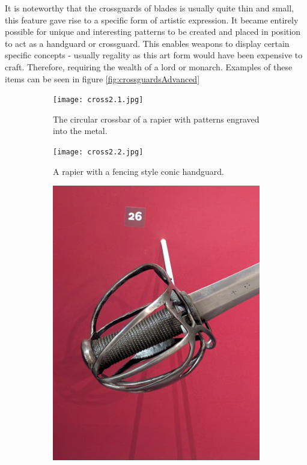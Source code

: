\documentclass{article}
\begin{document}
It is noteworthy that the crossguards of blades is usually quite thin and small, this feature gave rise to a specific form of artistic expression. It became entirely possible for unique and interesting patterns to be created and placed in position to act as a handguard or crossguard. This enables weapons to display certain specific concepts - usually regality as this art form would have been expensive to craft. Therefore, requiring the wealth of a lord or monarch. Examples of these items can be seen in figure \ref{fig:crossguardsAdvanced}

\begin{figure}[H]
    \centering
    \caption{A collection of artistically designed crossbars and handguards.}
    \label{fig:crossguardsAdvanced}
    \begin{subfigure}{0.3\textwidth}
        \centering
        \texttt{[image: cross2.1.jpg]}
        \caption{The circular crossbar of a rapier with patterns engraved into the metal.}
        \label{fig:Cross2.1}
    \end{subfigure}
        \begin{subfigure}{0.3\textwidth}
        \centering
        \texttt{[image: cross2.2.jpg]}
        \caption{A rapier with a fencing style conic handguard.}
        \label{fig:Cross2.2}
    \end{subfigure}
        \begin{subfigure}{0.3\textwidth}
        \centering
        \includegraphics[width=\textwidth]{cross2.4.jpg}

\end{subfigure}
\end{figure}
\end{document}
